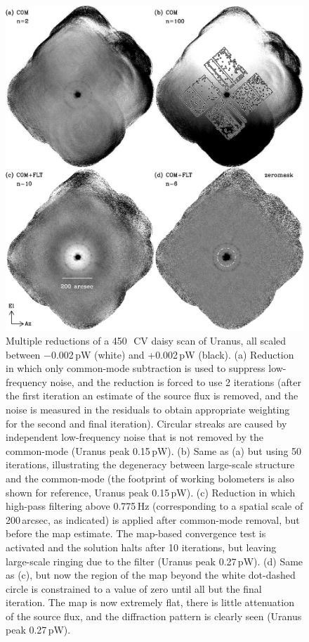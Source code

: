 \documentclass[useAMS,usenatbib,nofootinbib]{mn2e}
\begin{document}
\begin{figure}
\centering
\includegraphics[width=\linewidth]{pointmaps}
\caption{Multiple reductions of a 450\,\micron\ CV daisy scan of
  Uranus, all scaled between $-$0.002\,pW (white) and +0.002\,pW
  (black). (a) Reduction in which only common-mode subtraction is used
  to suppress low-frequency noise, and the reduction is forced to use
  2 iterations (after the first iteration an estimate of the source
  flux is removed, and the noise is measured in the residuals to
  obtain appropriate weighting for the second and final
  iteration). Circular streaks are caused by independent low-frequency
  noise that is not removed by the common-mode (Uranus peak
  0.15\,pW). (b) Same as (a) but using 50 iterations, illustrating the
  degeneracy between large-scale structure and the common-mode (the
  footprint of working bolometers is also shown for reference, Uranus
  peak 0.15\,pW). (c) Reduction in which high-pass filtering above
  0.775\,Hz (corresponding to a spatial scale of 200\,arcsec, as
  indicated) is applied after common-mode removal, but before the map
  estimate. The map-based convergence test is activated and the
  solution halts after 10 iterations, but leaving large-scale ringing
  due to the filter (Uranus peak 0.27\,pW). (d) Same as (c), but now
  the region of the map beyond the white dot-dashed circle is
  constrained to a value of zero until all but the final iteration.
  The map is now extremely flat, there is little attenuation of the
  source flux, and the diffraction pattern is clearly seen (Uranus
  peak 0.27\,pW).}
\label{fig:pointmaps}
\end{figure}
\end{document}
